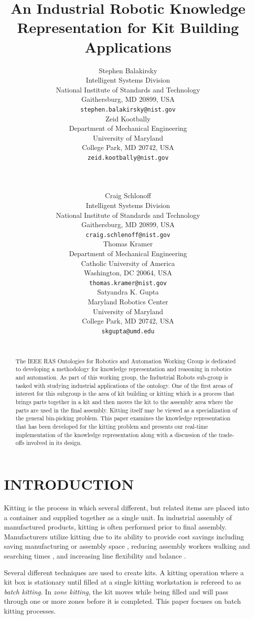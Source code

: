 \documentclass[a4paper, 10pt, conference]{ieeeconf}      %
\title{\LARGE \bf
An  Industrial Robotic Knowledge Representation for Kit Building Applications
}
\author{ \parbox{3 in}{\centering Stephen Balakirsky\\
         Intelligent Systems Division\\
         National Institute of Standards and Technology\\
        Gaithersburg, MD 20899, USA\\
         {\tt\small stephen.balakirsky@nist.gov}}
         \hspace*{ 0.5 in}
         \parbox{3 in}{ \centering Zeid Kootbally\\
          Department of Mechanical Engineering \\
         University of Maryland\\
         College Park, MD 20742, USA\\
         {\tt\small zeid.kootbally@nist.gov}}\\ \\
	\parbox{2.25 in}{\centering Craig Schlonoff\\
         Intelligent Systems Division\\
         National Institute of Standards and Technology\\
        Gaithersburg, MD 20899, USA\\
         {\tt\small craig.schlenoff@nist.gov}}
        \hspace*{0.05in}
         \parbox{2.25 in}{ \centering Thomas Kramer\\
          Department of Mechanical Engineering \\
         Catholic University of America\\
         Washington, DC 20064, USA\\
         {\tt\small thomas.kramer@nist.gov}}
        \hspace*{0.05in}
         \parbox{2.25 in}{ \centering Satyandra K. Gupta\\
          Maryland Robotics Center\\
         University of Maryland\\
         College Park, MD 20742, USA\\
         {\tt\small skgupta@umd.edu}}\\
}
\begin{document}
\maketitle
\thispagestyle{empty}
\pagestyle{empty}


\begin{abstract}

The IEEE RAS Ontologies for Robotics and Automation Working Group is dedicated to developing a methodology for knowledge representation and reasoning in robotics and automation. As part of this working group, the Industrial Robots sub-group is tasked with studying industrial applications of the ontology. One of the first areas of interest for this subgroup is the area of kit building or kitting which is a process that brings parts together in a kit and then moves the kit to the assembly area where the parts are used in the final assembly. Kitting itself may be viewed as a specialization of the general bin-picking problem. This paper examines the knowledge representation that has been developed for the kitting problem and presents our real-time implementation of the knowledge representation along with a discussion of the trade-offs involved in its design.

\end{abstract}


\section{INTRODUCTION}
Kitting is the process in which several different, but related items are placed into a container and supplied together as a single unit.
In industrial assembly of manufactured products, kitting is often performed prior to final assembly. Manufacturers utilize kitting
due to its ability to provide cost savings \cite{Carlsson_2008} including saving manufacturing or assembly space \cite{Medbo2003}, reducing assembly workers walking and searching times \cite{Schwind1992}, and increasing line flexibility \cite{Bozer1992} and balance \cite{Jiao2000}.

Several different techniques are used to create kits. A kitting operation where a kit box is stationary until filled at a single
kitting workstation is refereed to as {\it batch kitting}. In {\it zone kitting}, the kit moves while being filled and will pass through one or
more zones before it is completed. This paper focuses on batch kitting processes.
\end{document}
